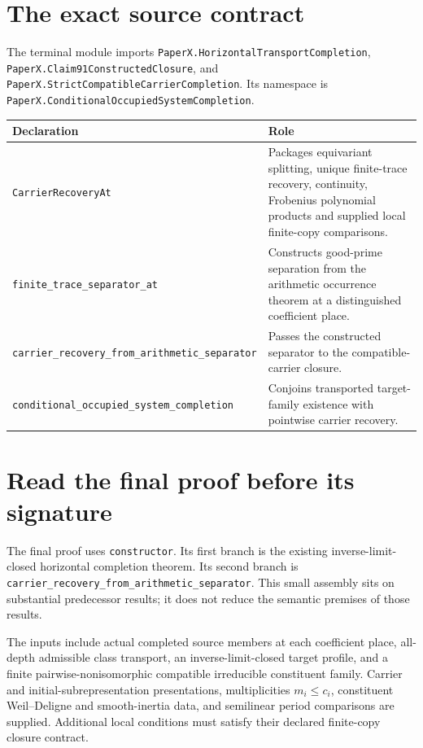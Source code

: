 \documentclass[11pt]{article}
\begin{document}
\KomorebiCover
\begin{abstract}
This guide records the final conditional occupied-system completion endpoint for Paper X, its independent target-family and carrier-recovery outputs, its explicit semantic inputs, and its saved verification. The entire production module is printed from its source bytes. The earlier 20/20 conditional ledger and the later 19/20 unpromoted residual-system attempt are kept separate.
\end{abstract}
\tableofcontents
\section{The exact source contract}
The terminal module imports \nolinkurl{PaperX.HorizontalTransportCompletion}, \nolinkurl{PaperX.Claim91ConstructedClosure}, and \nolinkurl{PaperX.StrictCompatibleCarrierCompletion}. Its namespace is \nolinkurl{PaperX.ConditionalOccupiedSystemCompletion}.
\begin{longtable}{@{}p{.41\linewidth}p{.55\linewidth}@{}}\toprule
Declaration & Role\\\midrule
\nolinkurl{CarrierRecoveryAt} & Packages equivariant splitting, unique finite-trace recovery, continuity, Frobenius polynomial products and supplied local finite-copy comparisons.\\
\nolinkurl{finite_trace_separator_at} & Constructs good-prime separation from the arithmetic occurrence theorem at a distinguished coefficient place.\\
\nolinkurl{carrier_recovery_from_arithmetic_separator} & Passes the constructed separator to the compatible-carrier closure.\\
\nolinkurl{conditional_occupied_system_completion} & Conjoins transported target-family existence with pointwise carrier recovery.\\\bottomrule
\end{longtable}
\section{Read the final proof before its signature}
The final proof uses \nolinkurl{constructor}. Its first branch is the existing inverse-limit-closed horizontal completion theorem. Its second branch is \nolinkurl{carrier_recovery_from_arithmetic_separator}. This small assembly sits on substantial predecessor results; it does not reduce the semantic premises of those results.

The inputs include actual completed source members at each coefficient place, all-depth admissible class transport, an inverse-limit-closed target profile, and a finite pairwise-nonisomorphic compatible irreducible constituent family. Carrier and initial-subrepresentation presentations, multiplicities $m_i\leq c_i$, constituent Weil--Deligne and smooth-inertia data, and semilinear period comparisons are supplied. Additional local conditions must satisfy their declared finite-copy closure contract.
\end{document}
